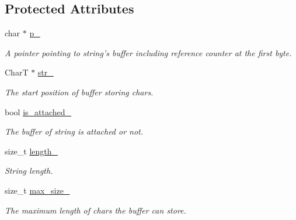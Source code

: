 \subsection*{Protected Attributes}
\begin{CompactItemize}
\item 
\hypertarget{classvector__string_c18abecf6d6a57aee75b0e9e5fd0e4b5}{
char $\ast$ \hyperlink{classvector__string_c18abecf6d6a57aee75b0e9e5fd0e4b5}{p\_\-}}
\label{classvector__string_c18abecf6d6a57aee75b0e9e5fd0e4b5}

\begin{CompactList}\small\item\em A pointer pointing to string's buffer including reference counter at the first byte. \item\end{CompactList}\item 
\hypertarget{classvector__string_e60195f21f225dfc18a9506214052517}{
CharT $\ast$ \hyperlink{classvector__string_e60195f21f225dfc18a9506214052517}{str\_\-}}
\label{classvector__string_e60195f21f225dfc18a9506214052517}

\begin{CompactList}\small\item\em The start position of buffer storing chars. \item\end{CompactList}\item 
\hypertarget{classvector__string_d3c80339c09eb33511812595561fc7d4}{
bool \hyperlink{classvector__string_d3c80339c09eb33511812595561fc7d4}{is\_\-attached\_\-}}
\label{classvector__string_d3c80339c09eb33511812595561fc7d4}

\begin{CompactList}\small\item\em The buffer of string is attached or not. \item\end{CompactList}\item 
\hypertarget{classvector__string_9bb782707a973ad6250e6385c7b6aca1}{
size\_\-t \hyperlink{classvector__string_9bb782707a973ad6250e6385c7b6aca1}{length\_\-}}
\label{classvector__string_9bb782707a973ad6250e6385c7b6aca1}

\begin{CompactList}\small\item\em String length. \item\end{CompactList}\item 
\hypertarget{classvector__string_731edda7e754d371b1efc4e6f68c1c19}{
size\_\-t \hyperlink{classvector__string_731edda7e754d371b1efc4e6f68c1c19}{max\_\-size\_\-}}
\label{classvector__string_731edda7e754d371b1efc4e6f68c1c19}

\begin{CompactList}\small\item\em The maximum length of chars the buffer can store. \item\end{CompactList}\end{CompactItemize}

